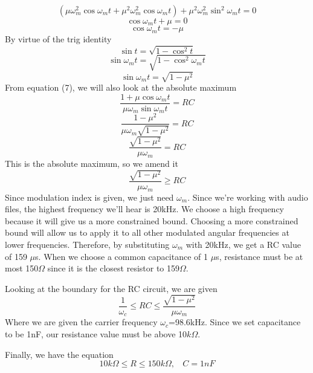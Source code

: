 \begin{equation}
    (\mu\omega_m^2\cos{\omega_mt}+\mu^2\omega_m^2\cos{\omega_mt})+\mu^2\omega_m^2\sin^2{\omega_mt}=0
\end{equation}
\begin{equation}
    \cos{\omega_mt}+\mu=0
\end{equation}
\begin{equation}
    \cos{\omega_mt}=-\mu
\end{equation}
By virtue of the trig identity
\begin{equation}
    \sin{t}=\sqrt{1-\cos^2{t}}
\end{equation}
\begin{equation}
    \sin{\omega_mt}=\sqrt{1-\cos^2{\omega_mt}}
\end{equation}
\begin{equation}
    \sin{\omega_mt}=\sqrt{1-\mu^2}
\end{equation}
From equation (7), we will also look at the absolute maximum
\begin{equation}
    \frac{1+\mu\cos{\omega_mt}}{\mu\omega_m\sin{\omega_mt}}=RC
\end{equation}
\begin{equation}
    \frac{1-\mu^2}{\mu\omega_m\sqrt{1-\mu^2}}=RC
\end{equation}
\begin{equation}
    \frac{\sqrt{1-\mu^2}}{\mu\omega_m}=RC
\end{equation}
This is the absolute maximum, so we amend it
\begin{equation}
    \frac{\sqrt{1-\mu^2}}{\mu\omega_m}\geq RC
\end{equation}
Since modulation index is given, we just need $\omega_m$. Since we're working with audio files, the highest frequency we'll hear is 20kHz. We choose a high frequency because it will give us a more constrained bound. Choosing a more constrained bound will allow us to apply it to all other modulated angular frequencies at lower frequencies. Therefore, by substituting $\omega_m$ with 20kHz, we get a RC value of 159 $\mu$s. When we choose a common capacitance of 1 $\mu$s, resistance must be at most 150$\Omega$ since it is the closest resistor to 159$\Omega$.

Looking at the boundary for the RC circuit, we are given
\begin{equation}
    \frac{1}{\omega_c}\leq RC\leq \frac{\sqrt{1-\mu^2}}{\mu\omega_m}
    \label{(20)}
\end{equation}
Where we are given the carrier frequency $\omega_c$=98.6kHz. Since we set capacitance to be 1nF, our resistance value must be above 10$k\Omega$.

Finally, we have the equation
\begin{equation}
    10k\Omega \leq R \leq 150k\Omega ,\ \ \ \ C=1nF
\end{equation}